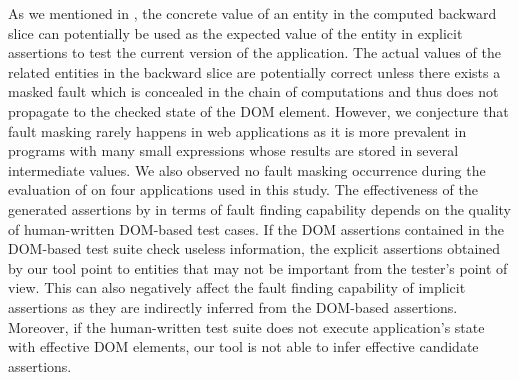  As we mentioned in , the concrete value of an entity in the computed backward slice can potentially be used as the expected value of the entity in explicit assertions to test the current version of the application.
The actual values of the related entities in the backward slice are potentially correct unless there exists a masked fault which is concealed in the chain of computations and thus does not propagate to the checked state of the DOM element. However, we conjecture that fault masking rarely happens in \javascript web applications as it is more prevalent in programs with many small expressions whose results are stored in several intermediate values. We also observed no fault masking occurrence during the evaluation of \tool on four \javascript applications used in this study.
 The effectiveness of the generated assertions by \tool in terms of fault finding capability depends on the quality of human-written DOM-based test cases. If the DOM assertions contained in the DOM-based test suite check useless information, the explicit assertions obtained by our tool point to entities that may not be important from the tester's point of view. This can also negatively affect the fault finding capability of implicit assertions as they are indirectly inferred from the DOM-based assertions. Moreover, if the human-written test suite does not execute application's state with effective DOM elements, our tool is not able to infer effective candidate assertions.   